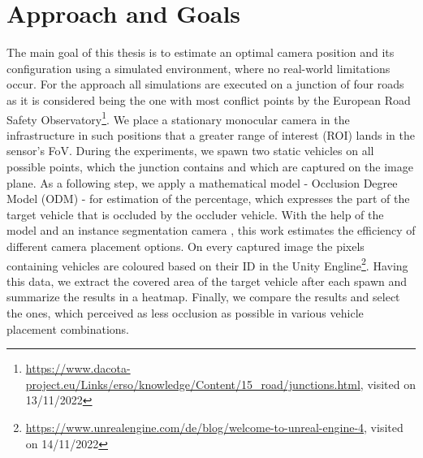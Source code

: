 

\section{Approach and Goals}

The main goal of this thesis is to estimate an optimal camera position and its configuration using a simulated environment, where no real-world limitations occur. For the approach all simulations are executed on a junction of four roads as it is considered being the one with most conflict points by the European Road Safety Observatory\footnote{\url{https://www.dacota-project.eu/Links/erso/knowledge/Content/15_road/junctions.html}, visited on 13/11/2022}. We place a stationary monocular camera in the infrastructure in such positions that a greater range of interest (ROI) lands in the sensor's FoV. During the experiments, we spawn two static vehicles on all possible points, which the junction contains and which are captured on the image plane. As a following step, we apply a mathematical model - Occlusion Degree Model (ODM) \cite{occlusion_degree_model} - for estimation of the percentage, which expresses the part of the target vehicle that is occluded by the occluder vehicle. With the help of the model and an instance segmentation camera \cite{instance_segmenatation_cam}, this work estimates the efficiency of different camera placement options. On every captured image the pixels containing vehicles are coloured based on their ID in the Unity Engline\footnote{\url{https://www.unrealengine.com/de/blog/welcome-to-unreal-engine-4}, visited on 14/11/2022}. Having this data, we extract the covered area of the target vehicle after each spawn and summarize the results in a heatmap. Finally, we compare the results and select the ones, which perceived as less occlusion as possible in various vehicle placement combinations. 
\newpage

